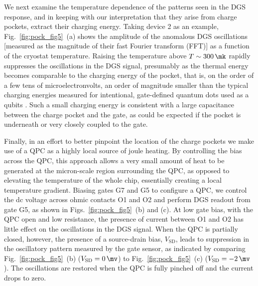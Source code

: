 We next examine the temperature dependence of the patterns seen in the DGS response, and in keeping with our interpretation that they arise from charge pockets, extract their charging energy. Taking device 2 as an example, Fig.~\ref{fig:pock_fig5}~(a) shows the amplitude of the anomalous DGS oscillations [measured as the magnitude of their fast Fourier transform (FFT)] as a function of the cryostat temperature. Raising the temperature  above $T \sim \SI{300}{\mk}$ rapidly suppresses the oscillations in the DGS signal, presumably as the thermal energy becomes comparable to the charging energy of the pocket, that is, on the order of a few tens of microelectronvolts, an order of magnitude smaller than the typical charging energies measured for intentional, gate-defined quantum dots used as a qubits \cite{RevModPhys.79.1217}. Such a small charging energy is consistent with a large capacitance between the charge pocket and the gate, as could be expected if the pocket is underneath or very closely coupled to the gate.

Finally, in an effort to better pinpoint the location of the charge pockets we make use of a QPC as a highly local source of joule heating. By controlling the bias across the QPC, this approach allows a very small amount of heat to be generated at the micron-scale region surrounding the QPC, as opposed to elevating the temperature of the whole chip, essentially creating a local temperature gradient. Biasing gates G7 and G5 to configure a QPC, we control the dc voltage across ohmic contacts O1 and O2 and perform DGS readout from gate G5, as shown in Figs.~\ref{fig:pock_fig5}~(b) and (c). At low gate bias, with the QPC open and low resistance, the presence of current between O1 and O2 has little effect on the oscillations in the DGS signal. When the QPC is partially closed, however, the presence of a source-drain bias, $V_{\textrm{SD}}$, leads to suppression in the oscillatory pattern measured by the gate sensor, as indicated by comparing Fig.~\ref{fig:pock_fig5}~(b) ($V_{\textrm{SD}} = \SI{0}{\mv}$) to Fig.~\ref{fig:pock_fig5}~(c) ($V_{\textrm{SD}} = \SI{-2}{\mv}$). The oscillations are restored when the QPC is fully pinched off and the current drops to zero.

